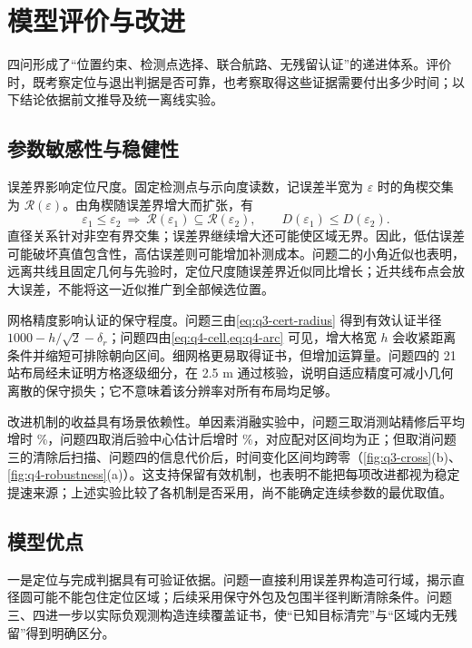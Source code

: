 \section{模型评价与改进}\label{sec:evaluation}
四问形成了“位置约束、检测点选择、联合航路、无残留认证”的递进体系。评价时，既考察定位与退出判据是否可靠，也考察取得这些证据需要付出多少时间；以下结论依据前文推导及统一离线实验。

\subsection{参数敏感性与稳健性}
{\heiti 误差界影响定位尺度。}\songti 固定检测点与示向度读数，记误差半宽为 $\varepsilon$ 时的角楔交集为 $\mathcal R(\varepsilon)$。由角楔随误差界增大而扩张，有
\begin{equation}\label{eq:evaluation-error}
 \varepsilon_1\le\varepsilon_2
 \ \Longrightarrow\ 
 \mathcal R(\varepsilon_1)\subseteq\mathcal R(\varepsilon_2),\qquad
 D(\varepsilon_1)\le D(\varepsilon_2).
\end{equation}
直径关系针对非空有界交集；误差界继续增大还可能使区域无界。因此，低估误差可能破坏真值包含性，高估误差则可能增加补测成本。问题二的小角近似也表明，远离共线且固定几何与先验时，定位尺度随误差界近似同比增长；近共线布点会放大误差，不能将这一近似推广到全部候选位置。

{\heiti 网格精度影响认证的保守程度。}\songti 问题三由\cref{eq:q3-cert-radius} 得到有效认证半径 $1000-h/\sqrt2-\delta_r$；问题四由\cref{eq:q4-cell,eq:q4-arc} 可见，增大格宽 $h$ 会收紧距离条件并缩短可排除朝向区间。细网格更易取得证书，但增加运算量。问题四的 21 站布局经未证明方格逐级细分，在 2.5 m 通过核验，说明自适应精度可减小几何离散的保守损失；它不意味着该分辨率对所有布局均足够。

{\heiti 改进机制的收益具有场景依赖性。}\songti 单因素消融实验中，问题三取消测站精修后平均增时 \QThreeAblationPolishIncrease\%，问题四取消后验中心估计后增时 \QFourPosteriorChange\%，对应配对区间均为正；但取消问题三的清除后扫描、问题四的信息代价后，时间变化区间均跨零（\cref{fig:q3-cross}(b)、\cref{fig:q4-robustness}(a)）。这支持保留有效机制，也表明不能把每项改进都视为稳定提速来源；上述实验比较了各机制是否采用，尚不能确定连续参数的最优取值。

\subsection{模型优点}
{\heiti 一是定位与完成判据具有可验证依据。}\songti 问题一直接利用误差界构造可行域，揭示直径圆可能不能包住定位区域；后续采用保守外包及包围半径判断清除条件。问题三、四进一步以实际负观测构造连续覆盖证书，使“已知目标清完”与“区域内无残留”得到明确区分。

